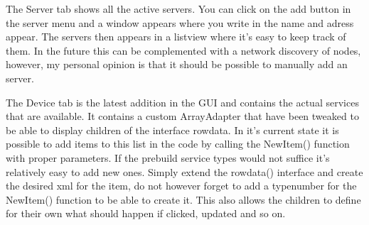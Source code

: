 \begin{center}
\end{center}
The Server tab shows all the active servers. You can click on the add button in the server menu and a window appears where you write in the name and adress appear. The servers then appears in a listview where it's easy to keep track of them. In the future this can be complemented with a network discovery of nodes, however, my personal opinion is that it should be possible to manually add an server.

\begin{center}
\end{center}
The Device tab is the latest addition in the GUI and contains the actual services that are available. It contains a custom ArrayAdapter that have been tweaked to be able to display children of the interface rowdata.
In it's current state it is possible to add items to this list in the code by calling the NewItem() function with proper parameters. If the prebuild service types would not suffice it's relatively easy to add new ones.
Simply extend the rowdata() interface and create the desired xml for the item, do not however forget to add a typenumber for the NewItem() function to be able to create it. 
This also allows the children to define for their own what should happen if clicked, updated and so on.
